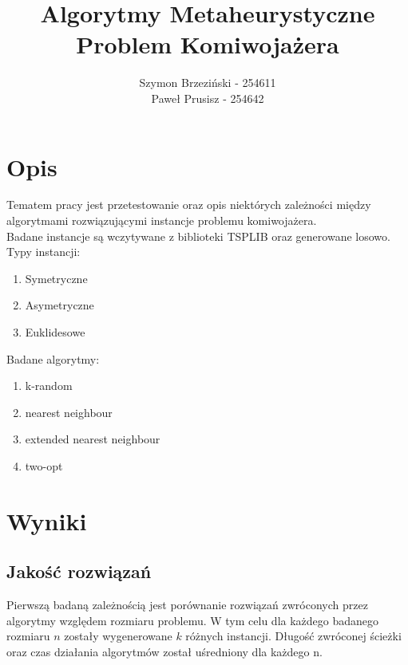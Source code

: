 \documentclass[11pt]{article}
\title{Algorytmy Metaheurystyczne\\\large Problem Komiwojażera}
\author{
        Szymon Brzeziński - 254611\\
        Paweł Prusisz - 254642
        }
\date{}
\begin{document}
\maketitle

\section{Opis}
Tematem pracy jest przetestowanie oraz opis niektórych zależności między algorytmami rozwiązującymi instancje problemu komiwojażera.
\\Badane instancje są wczytywane z biblioteki TSPLIB oraz generowane losowo.
\\Typy instancji:
\begin{enumerate}
    \item Symetryczne
    \item Asymetryczne
    \item Euklidesowe
\end{enumerate}
Badane algorytmy:
\begin{enumerate}
    \item k-random
    \item nearest neighbour
    \item extended nearest neighbour
    \item two-opt
\end{enumerate}
\section{Wyniki}
\subsection{Jakość rozwiązań }
Pierwszą badaną zależnością jest porównanie rozwiązań zwróconych przez algorytmy względem rozmiaru problemu. W tym celu dla każdego badanego rozmiaru  $n$ zostały wygenerowane $k$ różnych instancji. Długość zwróconej ścieżki oraz czas działania algorytmów został uśredniony dla każdego n.    
\end{document}
